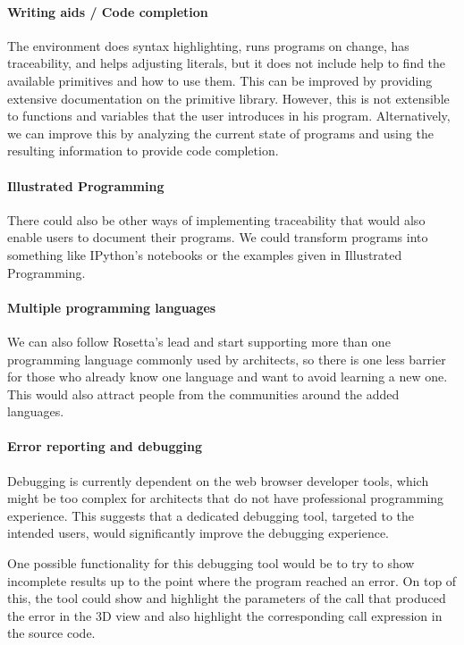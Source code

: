 \paragraph{Writing aids / Code completion}
The environment does syntax highlighting, runs programs on change, has traceability, and helps adjusting literals, but it does not include help to find the available primitives and how to use them.
This can be improved by providing extensive documentation on the primitive library.
However, this is not extensible to functions and variables that the user introduces in his program.
Alternatively, we can improve this by analyzing the current state of programs and using the resulting information to provide code completion.

\paragraph{Illustrated Programming}
There could also be other ways of implementing traceability that would also enable users to document their programs.
We could transform programs into something like IPython's notebooks or the examples given in Illustrated Programming\cite{Leitao2014illustrated}.

\paragraph{Multiple programming languages}
We can also follow Rosetta's lead and start supporting more than one programming language commonly used by architects, so there is one less barrier for those who already know one language and want to avoid learning a new one.
This would also attract people from the communities around the added languages.

\paragraph{Error reporting and debugging}
Debugging is currently dependent on the web browser developer tools, which might be too complex for architects that do not have professional programming experience.
This suggests that a dedicated debugging tool, targeted to the intended users, would significantly improve the debugging experience.

One possible functionality for this debugging tool would be to try to show incomplete results up to the point where the program reached an error.
On top of this, the tool could show and highlight the parameters of the call that produced the error in the 3D view and also highlight the corresponding call expression in the source code.

